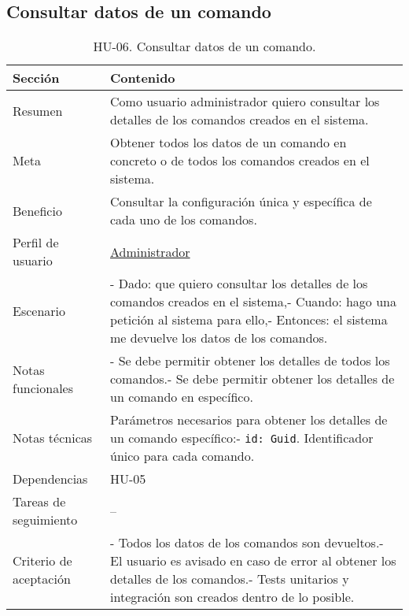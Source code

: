 \subsection{Consultar datos de un comando}

\begin{table}[H]
    \centering
    \def\arraystretch{1.25}
    \begin{adjustbox}{max width=\textwidth}
    \begin{tabularx}{\textwidth}{l|L}
    \hline
        \textbf{Sección} & \textbf{Contenido} \\ \hline
    \hline
        Resumen & Como usuario administrador quiero consultar los detalles de los comandos creados en el sistema. \\ \hline
        Meta & Obtener todos los datos de un comando en concreto o de todos los comandos creados en el sistema. \\ \hline
        Beneficio & Consultar la configuración única y específica de cada uno de los comandos. \\ \hline
        Perfil de usuario & \hyperref[sec:personaAdmin]{Administrador} \\ \hline
        Escenario & - Dado: que quiero consultar los detalles de los comandos creados en el sistema,\linebreak - Cuando: hago una petición al sistema para ello,\linebreak - Entonces: el sistema me devuelve los datos de los comandos. \\ \hline
        Notas funcionales & - Se debe permitir obtener los detalles de todos los comandos.\linebreak - Se debe permitir obtener los detalles de un comando en específico. \\ \hline
        Notas técnicas & Parámetros necesarios para obtener los detalles de un comando específico:\linebreak - \verb|id: Guid|. Identificador único para cada comando. \\ \hline
        Dependencias & HU-05 \\ \hline
        Tareas de seguimiento & – \\ \hline
        Criterio de aceptación & - Todos los datos de los comandos son devueltos.\linebreak - El usuario es avisado en caso de error al obtener los detalles de los comandos.\linebreak - Tests unitarios y integración son creados dentro de lo posible. \\ \hline
    \end{tabularx}
    \end{adjustbox}
    \caption{HU-06. Consultar datos de un comando.}
\end{table}

